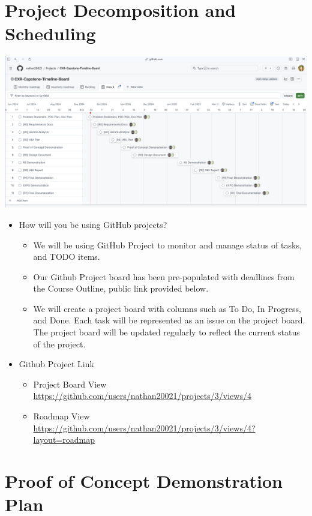 \documentclass{article}
\begin{document}
\section{Project Decomposition and Scheduling}

\includegraphics[scale=0.3]{prelim-timeline.png}
\begin{itemize}
    \item How will you be using GitHub projects? 
    \begin{itemize}
        \item We will be using GitHub Project to monitor and manage status of tasks, and TODO items.
        \item Our Github Project board has been pre-populated with deadlines from the Course Outline, public link provided below. 
        \item We will create a project board with columns such as To Do, In Progress, and Done. Each task will be represented as an issue on the project board. The project board will be updated regularly to reflect the current status of the project.
    \end{itemize}
    \item Github Project Link 
    \begin{itemize}
        \item Project Board View \url{https://github.com/users/nathan20021/projects/3/views/4}
        \item Roadmap View \url{https://github.com/users/nathan20021/projects/3/views/4?layout=roadmap}
    \end{itemize}
\end{itemize}



\section{Proof of Concept Demonstration Plan}
\end{document}
